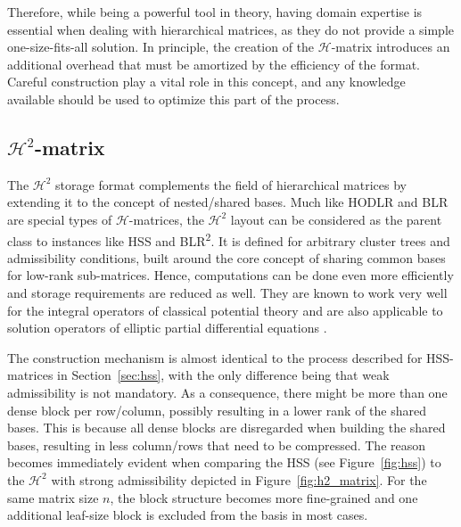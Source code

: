 Therefore, while being a powerful tool in theory, having domain expertise is essential when dealing with hierarchical matrices, as they do not provide a simple one-size-fits-all solution. In principle, the creation of the $\mathcal{H}$-matrix introduces an additional overhead that must be amortized by the efficiency of the format. Careful construction play a vital role in this concept, and any knowledge available should be used to optimize this part of the process.


\subsection{\texorpdfstring{$\mathcal{H}^2$}{H2}-matrix}
\label{sec:h2_matrix}

The $\mathcal{H}^2$ storage format complements the field of hierarchical matrices by extending it to the concept of nested/shared bases. Much like HODLR and BLR are special types of $\mathcal{H}$-matrices, the  $\mathcal{H}^2$ layout can be considered as the parent class to instances like HSS and BLR\textsuperscript{2}. It is defined for arbitrary cluster trees and admissibility conditions, built around the core concept of sharing common bases for low-rank sub-matrices. Hence, computations can be done even more efficiently and storage requirements are reduced as well. They are known to work very well for the integral operators of classical potential theory and are also applicable to solution operators of elliptic partial differential equations \cite{borm_h2-matrix_2006}.

The construction mechanism is almost identical to the process described for HSS-matrices in Section~\hyperref[sec:hss]{\ref{sec:hss}}, with the only difference being that weak admissibility is not mandatory. As a consequence, there might be more than one dense block per row/column, possibly resulting in a lower rank of the shared bases. This is because all dense blocks are disregarded when building the shared bases, resulting in less column/rows that need to be compressed. The reason becomes immediately evident when comparing the HSS (see Figure~\hyperref[fig:hss]{\ref{fig:hss}}) to the $\mathcal{H}^2$ with strong admissibility depicted in Figure~\hyperref[fig:h2_matrix]{\ref{fig:h2_matrix}}. For the same matrix size $n$, the block structure becomes more fine-grained and one additional leaf-size block is excluded from the basis in most cases.

